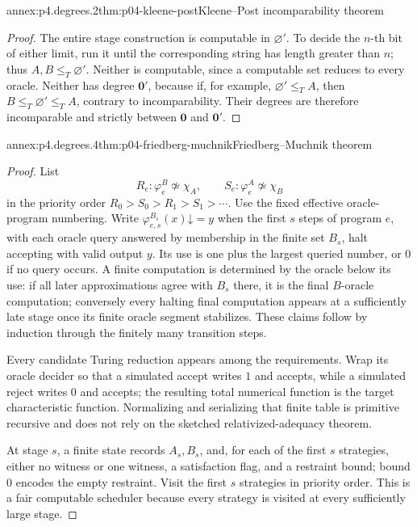 \begin{annexitem}{annex:p4.degrees.2}{thm:p04-kleene-post}{Kleene--Post incomparability theorem}
\begin{proof}
The entire stage construction is computable in \(\varnothing'\).  To decide
the \(n\)-th bit of either limit, run it until the corresponding string has
length greater than \(n\); thus \(A,B\leq_T\varnothing'\).  Neither is
computable, since a computable set reduces to every oracle.  Neither has
degree \(\mathbf0'\), because if, for example,
\(\varnothing'\leq_TA\), then \(B\leq_T\varnothing'\leq_TA\), contrary to
incomparability.  Their degrees are therefore incomparable and strictly
between \(\mathbf0\) and \(\mathbf0'\).
\end{proof}
\end{annexitem}

\begin{annexitem}{annex:p4.degrees.4}{thm:p04-friedberg-muchnik}{Friedberg--Muchnik theorem}
\begin{proof}
List
\[
 R_e:\varphi_e^B\not\simeq\chi_A,
 \qquad S_e:\varphi_e^A\not\simeq\chi_B
\]
in the priority order \(R_0>S_0>R_1>S_1>\cdots\).  Use the fixed effective
oracle-program numbering.  Write
\(\varphi^{B_s}_{e,s}(x)\mathord\downarrow=y\) when the first \(s\) steps of
program \(e\), with each oracle query answered by membership in the finite set
\(B_s\), halt accepting with valid output \(y\).  Its use is one plus the
largest queried number, or \(0\) if no query occurs.  A finite computation is
determined by the oracle below its use: if all later approximations agree with
\(B_s\) there, it is the final \(B\)-oracle computation; conversely every
halting final computation appears at a sufficiently late stage once its finite
oracle segment stabilizes.  These claims follow by induction through the
finitely many transition steps.

Every candidate Turing reduction appears among the requirements.  Wrap its
oracle decider so that a simulated accept writes \(1\) and accepts, while a
simulated reject writes \(0\) and accepts; the resulting total numerical
function is the target characteristic function.  Normalizing and serializing
that finite table is primitive recursive and does not rely on the sketched
relativized-adequacy theorem.

At stage \(s\), a finite state records
\(A_s,B_s\), and, for each of the first \(s\) strategies, either no witness or
one witness, a satisfaction flag, and a restraint bound; bound \(0\) encodes
the empty restraint.  Visit the first \(s\) strategies in priority order.
This is a fair computable scheduler because every strategy is visited at every
sufficiently large stage.


\end{proof}
\end{annexitem}
